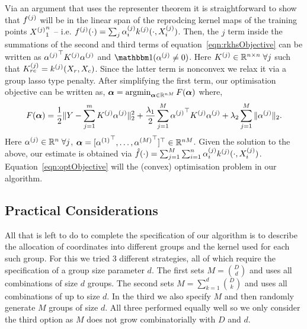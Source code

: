 Via an argument that uses the representer theorem it is straightforward to show
that $f^{(j)}$ will be in the linear span of the reprodcing kernel maps of the
training points ${X^{(j)}}_1^n$ -- i.e. $f^{(j)}(\cdot) = 
\sum_j \alpha^{(j)}_i k^{(j)}(\cdot, X^{(j)}_i) $.
Then, the $j$ term inside the summations of the second and third
terms of equation~\eqref{eqn:rkhsObjective} can be written as 
${\alpha^{(j)}}^\top K^{(j)} \alpha^{(j)}$ and $\indfone(\alphaj \neq 0)$.
Here $K^{(j)} \in \mathbb{R}^{n\times n}\; \forall
j$ such that $K^{(j)}_{rc} = k^{(j)}(X_r, X_c)$.
Since the latter term is nonconvex we relax it via a group lasso type penalty.
After simplifying the first term, our optimisation objective can be written as,
${\bm{\alpha}} = \mathop{\mathrm{argmin}}_{{\bm{\alpha}} \in \mathbb{R}^{nM}} F({\bm{\alpha}})$ where,
\begin{equation}
F({\bm{\alpha}}) = \frac{1}{2}\|Y - \sum_{j=1}^m K^{(j)} \alpha^{(j)}\|_2^2 + 
  \frac{\lambda_1}{2} \sum_{j=1}^M {\alpha^{(j)}}^\top K^{(j)} \alpha^{(j)} +
  \lambda_2 \sum_{j=1}^M \| \alpha^{(j)} \|_2.
\label{eqn:optObjective}
\end{equation}
Here $\alpha^{(j)} \in \mathbb{R}^n \; \forall j$, ${\bm{\alpha}} = [{\alpha^{(1)}}^\top, \dots, 
{\alpha^{(M)}}^\top]^\top  \in\mathbb{R}^{nM}$. Given the solution to the above, our
estimate is obtained via $\hat{f}(\cdot) = \sum_{j=1}^M \sum_{i=1}^n \alpha^{(j)}_i
k^{(j)}(\cdot, X^{(j)}_i)$.
Equation~\eqref{eqn:optObjective} will the (convex) optimisation problem in our
algorithm.

\subsection{Practical Considerations}

All that is left to do to complete the specification of our algorithm is to
describe the allocation of coordinates into different groups and the kernel used
for each such group. For this we tried 3 different strategies, all of which
require the specification of a group size parameter $d$. The first sets $M = {D
\choose d}$ and uses all combinations of size $d$ groups. The second sets $M =
\sum_{k=1}^d {D \choose k}$ and uses all combinations of up to size $d$. In the
third we also specify $M$ and then randomly generate $M$ groups of size $d$.
All three performed equally well so we only consider the third option as $M$
does not grow combinatorially with $D$ and $d$.

